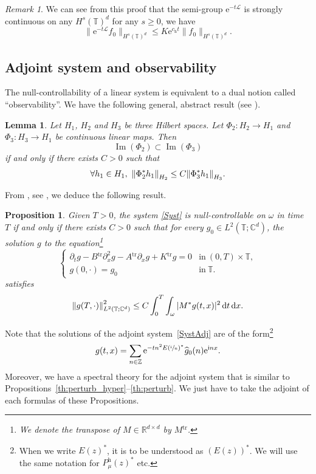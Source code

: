 \documentclass[10pt]{amsart}
\let\mathcal\mathscr
\theoremstyle{plain}
\newtheorem{prop}[theorem]{Proposition}
\newtheorem{lemma}[theorem]{Lemma}
\theoremstyle{definition}
\theoremstyle{remark}
\newtheorem{remark}[theorem]{Remark}
\DeclareMathOperator{\Ima}{Im}
\newcommand{\norme}[1]{\left\lVert#1\right\rVert}
\newcommand{\diff}[1][-3]{\ensuremath{\mathop{}\mkern#1mu\mathrm{d}}}
\newcommand{\set}{\mathbb}
\renewcommand{\C}{\set{C}}
\newcommand{\T}{\set{T}}
\newcommand{\Tr}[1]{{#1}{}^{\mathrm{tr}}}
\newcommand{\h}{{\mathrm h}}
\newcommand{\eu}{\mathrm e}
\newcommand{\iu}{\mathrm i}
\let\originalleft\left
\let\originalright\right
\renewcommand{\left}{\mathopen{}\mathclose\bgroup\originalleft}
\renewcommand{\right}{\aftergroup\egroup\originalright}
\begin{document}
\begin{remark}\label{rk:semigroup_Hs}
We can see from this proof that the semi-group $\eu^{-t\mathcal L}$ is strongly continuous on any $H^s(\T)^d$ for any $s\geq 0$, \ie we have
\[
\|\eu^{-t\mathcal L} f_0\|_{H^s(\T)^d} \leq K\eu^{c_\h t}\|f_0\|_{H^s(\T)^d}.
\]
\end{remark}

\subsection{Adjoint system and observability}
\label{Paragraphdual}

The null-controllability of a linear system is equivalent to a dual notion called ``observability''. We have the following general, abstract result (see \cite[Lem.\,2.48]{coron_2007}).
\begin{lemma}
\label{LemmaDuality}
Let $H_1$, $H_2$ and $H_3$ be three Hilbert spaces. Let $\Phi_2\colon H_2 \to H_1$ and $\Phi_3\colon H_3 \to H_1$ be continuous linear maps. Then
\[
\Ima(\Phi_2) \subset \Ima(\Phi_3)
\]
if and only if there exists $C>0$ such that
\[
\forall h_1 \in H_1,\ \norme{\Phi_2^{*} h_1}_{H_2} \leq C \norme{\Phi_3^{*} h_1}_{H_3}.
\]
\end{lemma}

\pagebreak[2]
From , see \cite[Th.\,2.44]{coron_2007}, we deduce the following result.
\begin{prop}\label{Hum}
Given $T>0$, the system \eqref{Syst} is null-controllable on $\omega$ in time~$T$ if and only if there exists $C>0$ such that for every $g_0 \in L^2(\T;\C^{d})$, the solution $g$ to the equation\footnote{We denote the transpose of $M\in\set R^{d\times d}$ by $\Tr M$.}
\begin{equation}
\label{SystAdj}
\begin{cases}
\partial_t g - \Tr{B} \partial_{x}^2 g - \Tr{A} \partial_x g + \Tr{K} g = 0&\text{in}\ (0,T)\times\T,\\
g(0,\cdot)=g_{0}& \text{in}\ \T.
\end{cases}
\end{equation}
satisfies
\begin{equation}
\label{ObsHumG}
\norme{g(T,\cdot)}_{L^2(\T;\C^{d})}^2 \leq C \int_{0}^{T} \int_{\omega} |M^* g(t,x)|^{2} \diff t \diff x.
\end{equation}
\end{prop}

Note that the solutions of the adjoint system~\eqref{SystAdj} are of the form\footnote{When we write $E(z)^\ast$, it is to be understood as $(E(z))^\ast$. We will use the same notation for $P_\mu^\h(z)^\ast$ etc.}
\begin{equation}\label{eq:sol_adj}
g(t,x) = \sum_{n\in\set Z} \eu^{- tn^2E\left(\sfrac{\iu}{n}\right)^\ast} \widehat{g}_0(n) \eu^{\iu nx}.
\end{equation}
Moreover, we have a spectral theory for the adjoint system that is similar to Propositions~\ref{th:perturb_hyper}--\ref{th:perturb}. We just have to take the adjoint of each formulas of these Propositions.
\end{document}
